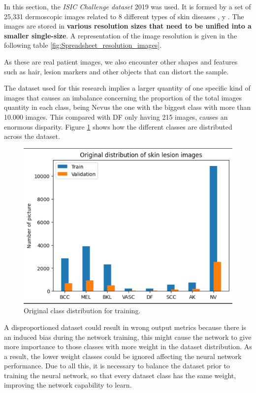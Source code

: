 In this section, the \textit{ISIC Challenge dataset}  2019 was used.  It is formed by a set of 25,331 dermoscopic images related to 8 different types of skin diseases \cite{dataset_ref_1}, \cite{dataset_ref_2} y \cite{dataset_ref_3}. The images are stored in \textbf{various resolution sizes that need to be unified into a smaller single-size}. A representation of the image resolution is given in the following table \ref{fig:Spreadsheet_resolution_images}. 

\newpage
As these are real patient images, we also encounter other shapes and features such as hair, lesion markers and other objects that can distort the sample.

The dataset used for this research implies a larger quantity of one specific kind of images that causes an imbalance concerning the proportion of the total images quantity in each class, being Nevus the one with the biggest class with more than 10.000 images. This compared with DF only having 215 images, causes an enormous disparity. Figure \ref{fig:class_distribution_for_train} shows how the different classes are distributed across the dataset. 

\begin{figure}[ht]
    \centering
        \includegraphics[scale=0.75]{images/Building/Original_distribution_skin_lesion_images.png}
        \caption{Original class distribution for training.}
    \label{fig:class_distribution_for_train}
\end{figure}


A disproportioned dataset could result in wrong output metrics because there is an induced bias during the network training, this might cause the network to give more importance to those classes with more weight in the dataset distribution. As a result, the lower weight classes could be ignored affecting the neural network performance. Due to all this, it is necessary to balance the dataset prior to training the neural network, so that every dataset class has the same weight, improving the network capability to learn. 

